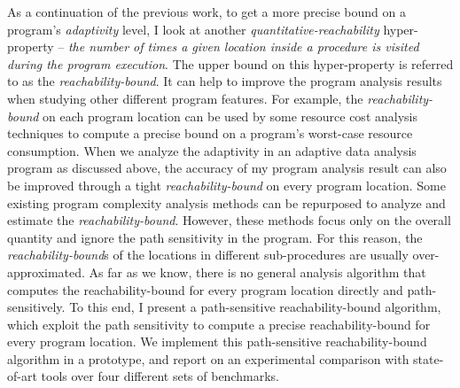 \begin{abstractpage}
    As a continuation of the previous work, to get a more precise bound on a program's \emph{adaptivity} level, I look at another \emph{quantitative-reachability} hyper-property -- \emph{the number of times a given  location inside a procedure is visited during the program execution}.
    The upper bound on this hyper-property is referred to as the \emph{reachability-bound}.
    It can help to improve the program analysis results when studying other different program features.
    For example, the \emph{reachability-bound} on each program location can be used by some resource cost analysis techniques to compute a precise bound on a program's worst-case resource consumption.
    When we analyze the adaptivity in an adaptive data analysis program as discussed above, the accuracy of my program analysis result can also be improved through a tight \emph{reachability-bound} on every program location.
    Some existing program complexity analysis methods can be repurposed to analyze and estimate the \emph{reachability-bound}.
    However, these methods focus only on the overall quantity and ignore the path sensitivity in the program.
    For this reason, the \emph{reachability-bound}s of the locations in different sub-procedures are usually over-approximated. 
    As far as we know, there is no general analysis algorithm that computes the reachability-bound for every program location directly and path-sensitively. 
    To this end, I present a path-sensitive reachability-bound algorithm, which exploit the path sensitivity to compute a precise reachability-bound for every program location.
    We implement this path-sensitive reachability-bound algorithm in a prototype, and report on an experimental comparison with state-of-art tools over four different sets of benchmarks.
    \end{abstractpage}
    
    